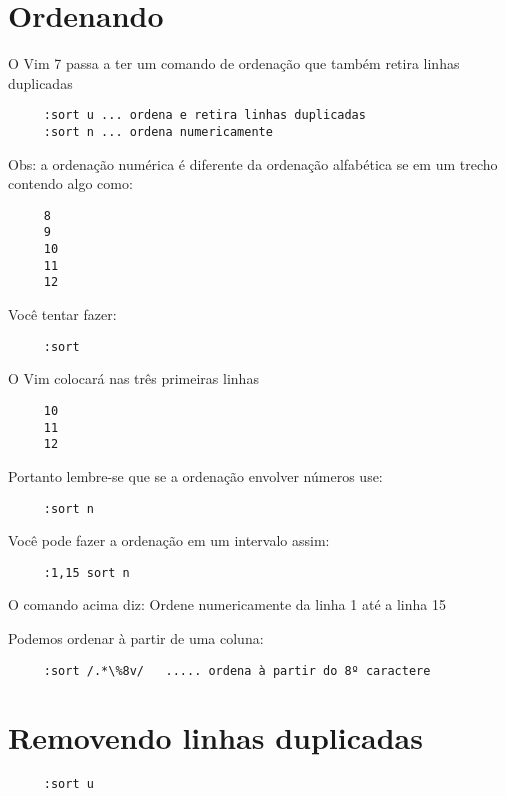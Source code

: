 \section{Ordenando}

O Vim 7 passa a ter um comando de ordenação que também retira linhas
duplicadas

\begin{verbatim}
     :sort u ... ordena e retira linhas duplicadas
     :sort n ... ordena numericamente
\end{verbatim}

Obs: a ordenação numérica é diferente da ordenação alfabética se em um
trecho contendo algo como:

\begin{verbatim}
     8
     9
     10
     11
     12
\end{verbatim}

Você tentar fazer:

\begin{verbatim}
     :sort
\end{verbatim}

O Vim colocará nas três primeiras linhas

\begin{verbatim}
     10
     11
     12
\end{verbatim}

Portanto lembre-se que se a ordenação envolver números use:

\begin{verbatim}
     :sort n
\end{verbatim}

Você pode fazer a ordenação em um intervalo assim:

\begin{verbatim}
     :1,15 sort n
\end{verbatim}

O comando acima diz: Ordene numericamente da linha 1 até a linha 15

Podemos ordenar à partir de uma coluna:

\begin{verbatim}
     :sort /.*\%8v/   ..... ordena à partir do 8º caractere
\end{verbatim}

\section{Removendo linhas duplicadas}

\begin{verbatim}
     :sort u
\end{verbatim}



